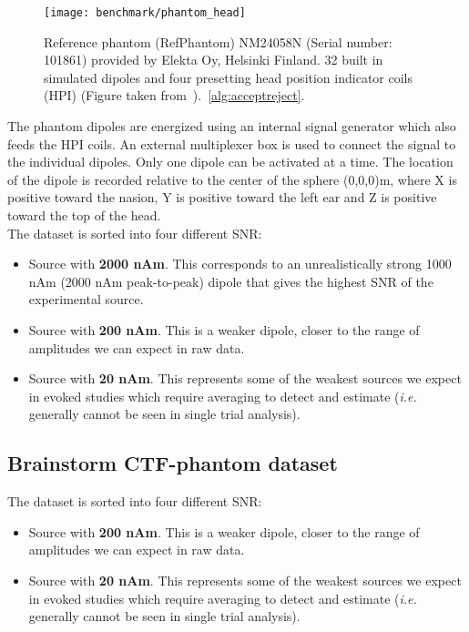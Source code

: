 \begin{figure}[tb]
   \centering
\texttt{[image: benchmark/phantom\_head]}
\caption{Reference phantom (RefPhantom) NM24058N (Serial number: 101861) provided by Elekta Oy, Helsinki Finland. 32 built in simulated dipoles and four presetting head position indicator coils (HPI) (Figure taken from~\cite{hazim2015magnetoencephalography}).~\ref{alg:acceptreject}.}
   \label{fig:phantom_head}
\end{figure}

The phantom dipoles are energized using an internal signal generator which also feeds the HPI coils. An external multiplexer box is used to connect the signal to the individual dipoles. Only one dipole can be activated at a time. The location of the dipole is recorded relative to the center of the sphere (0,0,0)m, where X is positive toward the nasion, Y is positive toward the left ear and Z is positive toward the top of the head.\\

The dataset is sorted into four different \ac{SNR}:
\begin{itemize}
\item Source with \textbf{2000 nAm}. This corresponds to an unrealistically strong 1000 nAm (2000 nAm peak-to-peak) dipole that gives the highest SNR of the experimental source.
\item Source with \textbf{200 nAm}. This is a weaker dipole, closer to the range of amplitudes we can expect in raw data.
\item Source with \textbf{20 nAm}. This represents some of the weakest sources we expect in evoked studies which require averaging to detect and estimate (\textit{i.e.} generally cannot be seen in single trial analysis).
\end{itemize}

\subsection{Brainstorm CTF-phantom dataset}

The dataset is sorted into four different SNR:
\begin{itemize}
\item Source with \textbf{200 nAm}. This is a weaker dipole, closer to the range of amplitudes we can expect in raw data.
\item Source with \textbf{20 nAm}. This represents some of the weakest sources we expect in evoked studies which require averaging to detect and estimate (\textit{i.e.} generally cannot be seen in single trial analysis).
\end{itemize}


